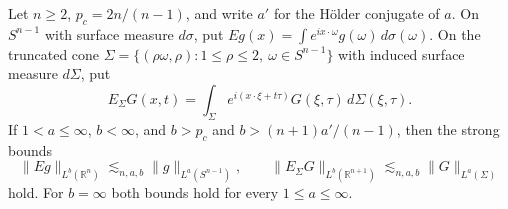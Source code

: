 Let \(n\ge2\), \(p_c=2n/(n-1)\), and write \(a'\) for the Hölder conjugate of \(a\). On \(S^{n-1}\) with surface measure \(d\sigma\), put \(Eg(x)=\int e^{ix\cdot\omega}g(\omega)\,d\sigma(\omega)\). On the truncated cone \(\Sigma=\{(\rho\omega,\rho):1\le\rho\le2,\ \omega\in S^{n-1}\}\) with induced surface measure \(d\Sigma\), put
\[
 E_\Sigma G(x,t)=\int_\Sigma e^{i(x\cdot\xi+t\tau)}G(\xi,\tau)\,d\Sigma(\xi,\tau).
\]
If \(1<a\le\infty\), \(b<\infty\), and \(b>p_c\) and \(b>(n+1)a'/(n-1)\), then the strong bounds
\[
 \|Eg\|_{L^b(\mathbb R^n)}\lesssim_{n,a,b}\|g\|_{L^a(S^{n-1})},\qquad
 \|E_\Sigma G\|_{L^b(\mathbb R^{n+1})}\lesssim_{n,a,b}\|G\|_{L^a(\Sigma)}
\]
hold. For \(b=\infty\) both bounds hold for every \(1\le a\le\infty\).
